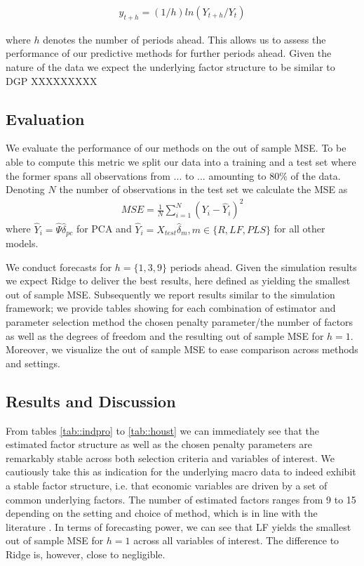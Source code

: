 \begin{align*}
	y_{t+h} = (1/h) ln(Y_{t+h}/Y_t)
\end{align*}

where $h$ denotes the number of periods ahead. This allows us to assess the performance of our predictive methods for further periods ahead.
Given the nature of the data we expect the underlying factor structure to be similar to DGP XXXXXXXXX 

\subsection{Evaluation}
We evaluate the performance of our methods on the out of sample MSE. To be able to compute this metric we split our data into a training and a test set where the former spans all observations from ... to ... amounting to 80\% of the data. Denoting $N$ the number of observations in the test set we calculate the MSE as
\begin{align*}
	    MSE = \frac{1}{N} \sum_{i=1}^N (Y_i - \widehat{Y}_i)^2
\end{align*}
where $\widehat{Y}_i = \widehat{\Psi} \widehat{\delta}_{pc}$ for PCA and $\widehat{Y}_i = X_{test} \widehat{\delta}_{m}, m \in \{R, LF, PLS\}$ for all other models. 

We conduct forecasts for $h = \{1, 3, 9\}$ periods ahead. Given the simulation results we expect Ridge to deliver the best results, here defined as yielding the smallest out of sample MSE. Subsequently we report results similar to the simulation framework; we provide tables showing for each combination of estimator and parameter selection method the chosen penalty parameter/the number of factors as well as the degrees of freedom and the resulting out of sample MSE for $h=1$. Moreover, we visualize the out of sample MSE to ease comparison across methods and settings.

\subsection{Results and Discussion}
From tables \ref{tab::indpro} to \ref{tab::houst} we can immediately see that the estimated factor structure as well as the chosen penalty parameters are remarkably stable across both selection criteria and variables of interest. We cautiously take this as indication for the underlying macro data to indeed exhibit a stable factor structure, i.e. that economic variables are driven by a set of common underlying factors. \citeauthor{} The number of estimated factors ranges from 9 to 15 depending on the setting and choice of method, which is in line with the literature \citeauthor{}.
In terms of forecasting power, we can see that LF yields the smallest out of sample MSE for $h=1$ across all variables of interest. The difference to Ridge is, however, close to negligible. 

